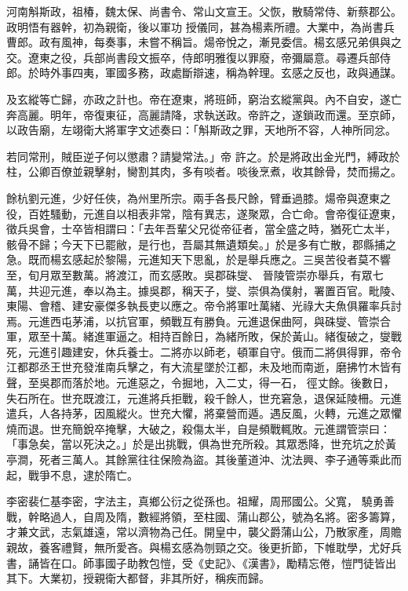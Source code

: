 \begin{pinyinscope}
 河南斛斯政，祖椿，魏太保、尚書令、常山文宣王。父恢，散騎常侍、新蔡郡公。政明悟有器幹，初為親衛，後以軍功
 授儀同，甚為楊素所禮。大業中，為尚書兵曹郎。政有風神，每奏事，未嘗不稱旨。煬帝悅之，漸見委信。楊玄感兄弟俱與之交。遼東之役，兵部尚書段文振卒，侍郎明雅復以罪廢，帝彌屬意。尋遷兵部侍郎。於時外事四夷，軍國多務，政處斷辯速，稱為幹理。玄感之反也，政與通謀。



 及玄縱等亡歸，亦政之計也。帝在遼東，將班師，窮治玄縱黨與。內不自安，遂亡奔高麗。明年，帝復東征，高麗請降，求執送政。帝許之，遂鎖政而還。至京師，以政告廟，左翊衛大將軍字文述奏曰：「斛斯政之罪，天地所不容，人神所同忿。



 若同常刑，賊臣逆子何以懲肅？請變常法。」帝
 許之。於是將政出金光門，縛政於柱，公卿百僚並親擊射，臠割其肉，多有啖者。啖後烹煮，收其餘骨，焚而揚之。



 餘杭劉元進，少好任俠，為州里所宗。兩手各長尺餘，臂垂過膝。煬帝與遼東之役，百姓騷動，元進自以相表非常，陰有異志，遂聚眾，合亡命。會帝復征遼東，徵兵吳會，士卒皆相謂曰：「去年吾輩父兄從帝征者，當全盛之時，猶死亡太半，骸骨不歸；今天下已罷敝，是行也，吾屬其無遺類矣。」於是多有亡散，郡縣捕之急。既而楊玄感起於黎陽，元進知天下思亂，於是舉兵應之。三吳苦役者莫不響至，旬月眾至數萬。將渡江，而玄感敗。吳郡硃燮、
 晉陵管崇亦舉兵，有眾七萬，共迎元進，奉以為主。據吳郡，稱天子，燮、崇俱為僕射，署置百官。毗陵、東陽、會稽、建安豪傑多執長吏以應之。帝令將軍吐萬緒、光祿大夫魚俱羅率兵討焉。元進西屯茅浦，以抗官軍，頻戰互有勝負。元進退保曲阿，與硃燮、管崇合軍，眾至十萬。緒進軍逼之。相持百餘日，為緒所敗，保於黃山。緒復破之，燮戰死，元進引趣建安，休兵養士。二將亦以師老，頓軍自守。俄而二將俱得罪，帝令江都郡丞王世充發淮南兵擊之，有大流星墜於江都，未及地而南逝，磨拂竹木皆有聲，至吳郡而落於地。元進惡之，令掘地，入二丈，得一石，
 徑丈餘。後數日，失石所在。世充既渡江，元進將兵拒戰，殺千餘人，世充窘急，退保延陵柵。元進遣兵，人各持茅，因風縱火。世充大懼，將棄營而遁。遇反風，火轉，元進之眾懼燒而退。世充簡銳卒掩擊，大破之，殺傷太半，自是頻戰輒敗。元進謂管崇曰：「事急矣，當以死決之。」於是出挑戰，俱為世充所殺。其眾悉降，世充坑之於黃亭澗，死者三萬人。其餘黨往往保險為盜。其後董道沖、沈法興、李子通等乘此而起，戰爭不息，逮於隋亡。



 李密裴仁基李密，字法主，真鄉公衍之從孫也。祖耀，周邢國公。父寬，
 驍勇善戰，幹略過人，自周及隋，數經將領，至柱國、蒲山郡公，號為名將。密多籌算，才兼文武，志氣雄遠，常以濟物為己任。開皇中，襲父爵蒲山公，乃散家產，周贍親故，養客禮賢，無所愛吝。與楊玄感為刎頸之交。後更折節，下帷耽學，尤好兵書，誦皆在口。師事國子助教包愷，受《史記》、《漢書》，勵精忘倦，愷門徒皆出其下。大業初，授親衛大都督，非其所好，稱疾而歸。




\end{pinyinscope}
